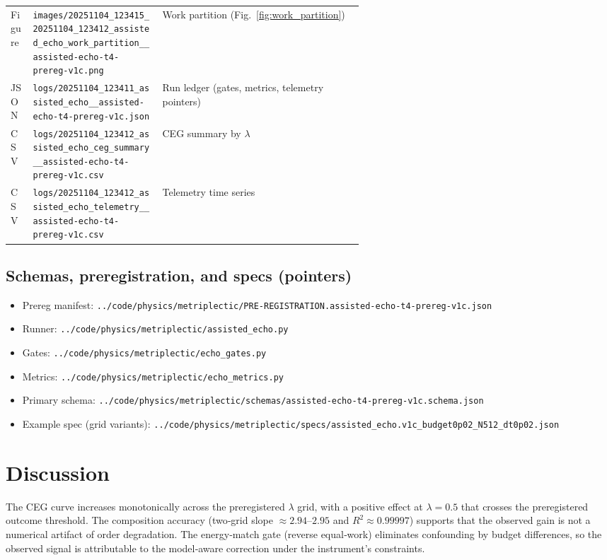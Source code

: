 \documentclass{article}
\begin{document}
\begin{longtable}{@{}llp{0.58\linewidth}@{}}
Figure & \texttt{images/20251104\_123415\_20251104\_123412\_assisted\_echo\_work\_partition\_\_assisted-echo-t4-prereg-v1c.png} & Work partition (Fig.~\ref{fig:work_partition}) \\
JSON  & \texttt{logs/20251104\_123411\_assisted\_echo\_\_assisted-echo-t4-prereg-v1c.json} & Run ledger (gates, metrics, telemetry pointers) \\
CSV   & \texttt{logs/20251104\_123412\_assisted\_echo\_ceg\_summary\_\_assisted-echo-t4-prereg-v1c.csv} & CEG summary by $\lambda$ \\
CSV   & \texttt{logs/20251104\_123412\_assisted\_echo\_telemetry\_\_assisted-echo-t4-prereg-v1c.csv} & Telemetry time series \\
\bottomrule
\end{longtable}

\subsection*{Schemas, preregistration, and specs (pointers)}
\begin{itemize}[leftmargin=*]
  \item Prereg manifest: \texttt{../code/physics/metriplectic/PRE-REGISTRATION.assisted-echo-t4-prereg-v1c.json}
  \item Runner: \texttt{../code/physics/metriplectic/assisted\_echo.py}
  \item Gates: \texttt{../code/physics/metriplectic/echo\_gates.py}
  \item Metrics: \texttt{../code/physics/metriplectic/echo\_metrics.py}
  \item Primary schema: \texttt{../code/physics/metriplectic/schemas/assisted-echo-t4-prereg-v1c.schema.json}
  \item Example spec (grid variants): \texttt{../code/physics/metriplectic/specs/assisted\_echo.v1c\_budget0p02\_N512\_dt0p02.json}
\end{itemize}

\section{Discussion}
The CEG curve increases monotonically across the preregistered $\lambda$ grid, with a positive effect at $\lambda=0.5$ that crosses the preregistered outcome threshold. The composition accuracy (two‑grid slope $\approx 2.94$–$2.95$ and $R^2 \approx 0.99997$) supports that the observed gain is not a numerical artifact of order degradation. The energy‑match gate (reverse equal‑work) eliminates confounding by budget differences, so the observed signal is attributable to the model‑aware correction under the instrument’s constraints.
\end{document}
